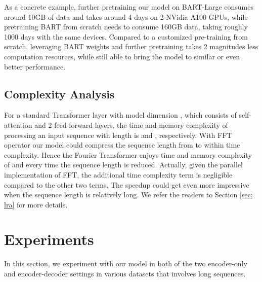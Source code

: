 \documentclass[11pt]{article}
\begin{document}
As a concrete example, further pretraining our model on BART-Large consumes around 10GB of data and takes around 4 days on 2 NVidia A100 GPUs, while pretraining BART from scratch needs to consume 160GB data, taking roughly 1000 days with the same devices. Compared to a customized pre-training from scratch, leveraging BART weights and further pretraining takes 2 magnitudes less computation resources, while still able to bring the model to similar or even better performance.



\subsection{Complexity Analysis}
\label{sec: complexity}
For a standard Transformer layer with model dimension , which consists of self-attention and 2 feed-forward layers, the time and memory complexity of processing an input sequence with length  is  and , respectively. With FFT operator our model could compress the sequence length from  to  within  time complexity. Hence the Fourier Transformer enjoys time and memory complexity of  and  every time the sequence length is reduced. Actually, given the parallel implementation of FFT, the additional  time complexity term is negligible compared to the other two terms. The speedup could get even more impressive when the sequence length is relatively long. We refer the readers to Section \ref{sec: lra} for more details. 



\section{Experiments}
\label{sec: exp}
In this section, we experiment with our model in both of the two encoder-only and encoder-decoder settings in various datasets that involves long sequences.
\end{document}
